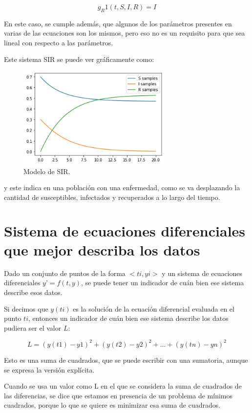 $$g_R1(t,S,I,R) = I$$

En este caso, se cumple además, que algunos de los parámetros presentes en varias de las ecuaciones son los mismos, pero eso no es un requisito para que sea lineal con respecto a las parámetros.

Este sistema SIR se puede ver gráficamente como:

\begin{figure}[!h]
    \centering

    \includegraphics[width=3in]{Graphics/sir_model.png}

    \caption{ \small{Modelo de SIR.}}

    \label{sir_model}

\end{figure}

y este indica en una población con una enfermedad, como se va desplazando la cantidad de susceptibles, infectados y recuperados a lo largo del tiempo.

\section{Sistema de ecuaciones diferenciales que mejor describa los datos}

Dado un conjunto de puntos de la forma $<ti, yi>$ y un sistema de ecuaciones diferenciales $y’ = f(t,y)$, se puede tener un indicador de cuán bien ese sistema describe esos datos.

Si decimos que $y(ti)$ es la solución de la ecuación diferencial evaluada en el punto $ti$, entonces un indicador de cuán bien ese sistema describe los datos pudiera ser el valor $L$:

$$L = (y(t1) - y1)^2 + (y(t2) - y2)^2 + …  + (y(tn) - yn)^2$$

Esto es una suma de cuadrados, que se puede escribir con una sumatoria, aunque se expresa la versión explícita.

Cuando se usa un valor como L en el que se considera la suma de cuadrados de las diferencias, se dice que estamos en presencia de un problema de mínimos cuadrados, porque lo que se quiere es minimizar esa suma de cuadrados.

